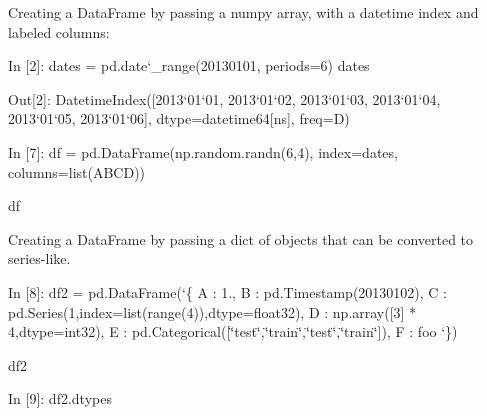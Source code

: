 \documentclass[letterpaper,10pt,english]{sphinxmanual}
\def\PYGZus{\char`\_}
\def\PYGZob{\char`\{}
\def\PYGZcb{\char`\}}
\def\PYGZhy{\char`\-}
\def\PYGZsq{\char`\'}
\def\PYGZdq{\char`\"}
\renewcommand\PYGZsq{\textquotesingle}
\begin{document}
Creating a DataFrame by passing a numpy array, with a datetime index and
labeled columns:

\begin{OriginalVerbatim}[commandchars=\\\{\}]
\textcolor{nbsphinxin}{In [2]: }dates = pd.date\PYGZus{}range(\PYGZsq{}20130101\PYGZsq{}, periods=6)
        dates
\end{OriginalVerbatim}

\begin{OriginalVerbatim}[commandchars=\\\{\}]
\textcolor{nbsphinxout}{Out[2]: }DatetimeIndex([\PYGZsq{}2013\PYGZhy{}01\PYGZhy{}01\PYGZsq{}, \PYGZsq{}2013\PYGZhy{}01\PYGZhy{}02\PYGZsq{}, \PYGZsq{}2013\PYGZhy{}01\PYGZhy{}03\PYGZsq{}, \PYGZsq{}2013\PYGZhy{}01\PYGZhy{}04\PYGZsq{},
                       \PYGZsq{}2013\PYGZhy{}01\PYGZhy{}05\PYGZsq{}, \PYGZsq{}2013\PYGZhy{}01\PYGZhy{}06\PYGZsq{}],
                      dtype=\PYGZsq{}datetime64[ns]\PYGZsq{}, freq=\PYGZsq{}D\PYGZsq{})
\end{OriginalVerbatim}

\begin{OriginalVerbatim}[commandchars=\\\{\}]
\textcolor{nbsphinxin}{In [7]: }df = pd.DataFrame(np.random.randn(6,4), index=dates, columns=list(\PYGZsq{}ABCD\PYGZsq{}))
        
        df
\end{OriginalVerbatim}

Creating a DataFrame by passing a dict of objects that can be converted
to series-like.

\begin{OriginalVerbatim}[commandchars=\\\{\}]
\textcolor{nbsphinxin}{In [8]: }df2 = pd.DataFrame(\PYGZob{} \PYGZsq{}A\PYGZsq{} : 1.,
        \PYGZsq{}B\PYGZsq{} : pd.Timestamp(\PYGZsq{}20130102\PYGZsq{}),
        \PYGZsq{}C\PYGZsq{} : pd.Series(1,index=list(range(4)),dtype=\PYGZsq{}float32\PYGZsq{}),
        \PYGZsq{}D\PYGZsq{} : np.array([3] * 4,dtype=\PYGZsq{}int32\PYGZsq{}),
        \PYGZsq{}E\PYGZsq{} : pd.Categorical([\PYGZdq{}test\PYGZdq{},\PYGZdq{}train\PYGZdq{},\PYGZdq{}test\PYGZdq{},\PYGZdq{}train\PYGZdq{}]),
        \PYGZsq{}F\PYGZsq{} : \PYGZsq{}foo\PYGZsq{} \PYGZcb{})
        
        df2
\end{OriginalVerbatim}

\begin{OriginalVerbatim}[commandchars=\\\{\}]
\textcolor{nbsphinxin}{In [9]: }df2.dtypes
\end{OriginalVerbatim}
\end{document}
